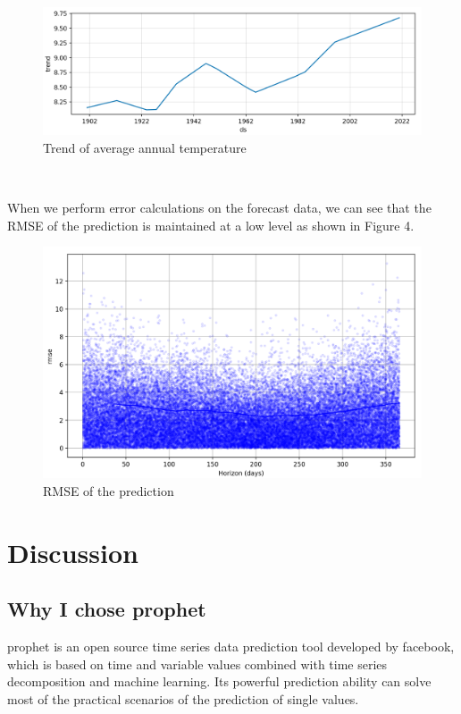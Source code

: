 \documentclass{article}
\begin{document}
\begin{figure}[hp]
\centering
\includegraphics[width=15cm]{trend.png} %
\caption{Trend of average annual temperature} %
\end{figure}

\ 

When we perform error calculations on the forecast data, we can see that the RMSE of the prediction is maintained at a low level as shown in Figure 4.

\begin{figure}[h]
\centering
\includegraphics[width=12cm]{rmse.png} %
\caption{RMSE of the prediction} %
\end{figure}



\newpage


\section{Discussion}

\subsection{Why I chose prophet}

prophet is an open source time series data prediction tool developed by facebook, which is based on time and variable values combined with time series decomposition and machine learning. Its powerful prediction ability can solve most of the practical scenarios of the prediction of single values.
\end{document}
